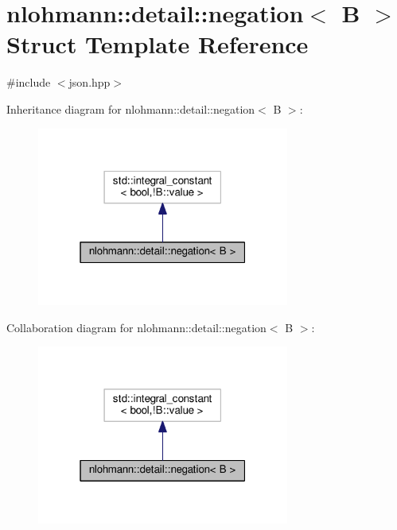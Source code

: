 \hypertarget{structnlohmann_1_1detail_1_1negation}{}\section{nlohmann\+:\+:detail\+:\+:negation$<$ B $>$ Struct Template Reference}
\label{structnlohmann_1_1detail_1_1negation}


{\ttfamily \#include $<$json.\+hpp$>$}



Inheritance diagram for nlohmann\+:\+:detail\+:\+:negation$<$ B $>$\+:\nopagebreak
\begin{figure}[H]
\begin{center}
\leavevmode
\includegraphics[width=235pt]{structnlohmann_1_1detail_1_1negation__inherit__graph}
\end{center}
\end{figure}


Collaboration diagram for nlohmann\+:\+:detail\+:\+:negation$<$ B $>$\+:\nopagebreak
\begin{figure}[H]
\begin{center}
\leavevmode
\includegraphics[width=235pt]{structnlohmann_1_1detail_1_1negation__coll__graph}
\end{center}
\end{figure}


